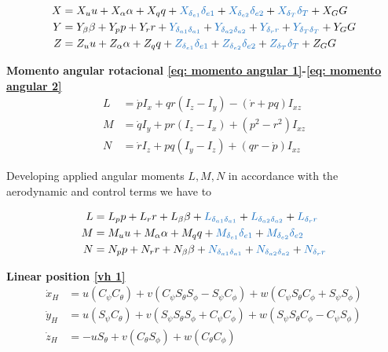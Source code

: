 \begin{align}
    X    &= X_u u + X_{\alpha}\alpha + X_q q + \textcolor{RoyalBlue}{X_{\delta_{e1}} \delta_{e1}}  + \textcolor{RoyalBlue}{X_{\delta_{e2}} \delta_{e2}} + \textcolor{RoyalBlue}{X_{\delta_{T}} \delta_{T}} + X_{G}G \\
    Y &= Y_{\beta} \beta + Y_{p}p + Y_{r} r + \textcolor{RoyalBlue}{Y_{\delta_{a1} \delta_{a1}}} + \textcolor{RoyalBlue}{Y_{\delta_{a2} \delta_{a2}}}  + \textcolor{RoyalBlue}{Y_{\delta_{r}r}} + \textcolor{RoyalBlue}{Y_{\delta_{T} \delta_{T}}} + Y_{G} G \\
    Z &= Z_u u + Z_{\alpha}\alpha + Z_q q + \textcolor{RoyalBlue}{Z_{\delta_{e1}} \delta_{e1}}  + \textcolor{RoyalBlue}{Z_{\delta_{e2}} \delta_{e2}} + \textcolor{RoyalBlue}{Z_{\delta_{T}} \delta_{T}} +  Z_{G}G  \\
\end{align}


\textbf{Momento angular rotacional \ref{eq: momento angular 1}-\ref{eq: momento angular 2}}\\
\begin{align}
\label{eq momentos ya 1}
    L &= \dot p I_{x} + qr(I_{z} - I_{y}) - (\dot r + pq)I_{xz} \\
    M &= \dot q I_{y} + pr(I_{z} - I_{x}) + (p^2 - r^2)I_{xz} \\
    N &= \dot r I_{z} + pq(I_{y} - I_{z}) + (qr - \dot p)I_{xz}
\label{eq momentos ya 2}
\end{align}

Developing applied angular moments $L,M,N$ in accordance with the aerodynamic and control terms we have to

\begin{align}
    L &= L_{p}p + L_{r}r + L_{\beta}\beta + \textcolor{RoyalBlue}{L_{\delta_{a1} \delta_{a1}}} + \textcolor{RoyalBlue}{L_{\delta_{a2} \delta_{a2}}}  + \textcolor{RoyalBlue}{L_{\delta_{r}r}} \\
    M &= M_{u}u + M_{\alpha}\alpha + M_{q}q + \textcolor{RoyalBlue}{M_{\delta_{e1}} \delta_{e1}}  + \textcolor{RoyalBlue}{M_{\delta_{e2}} \delta_{e2}} \\
    N &= N_{p}p + N_{r}r + N_{\beta}\beta + \textcolor{RoyalBlue}{N_{\delta_{a1} \delta_{a1}}} + \textcolor{RoyalBlue}{N_{\delta_{a2} \delta_{a2}}}  + \textcolor{RoyalBlue}{N_{\delta_{r}r}}
\end{align}

\textbf{Linear position \ref{vh 1}}
\begin{align}
\label{posi lineal 1}
    \dot x_H &= u(C_{\psi} C_{\theta}) + v (C_{\psi} S_{\theta} S_{\phi} - S_{\psi} C_{\phi}) + w (C_{\psi} S_{\theta} C_{\phi} + S_{\psi} S_{\phi})  \\
    \dot y_H &= u(S_{\psi} C_{\theta}) + v (S_{\psi} S_{\theta} S_{\phi} + C_{\psi} C_{\phi}) + w (S_{\psi} S_{\theta} C_{\phi} - C_{\psi} S_{\phi})  \\
    \dot z_H &= -u S_{\theta} + v (C_{\theta} S_{\phi}) + w (C_{\theta} C_{\phi}) 
\label{posi lineal 2}
\end{align}


